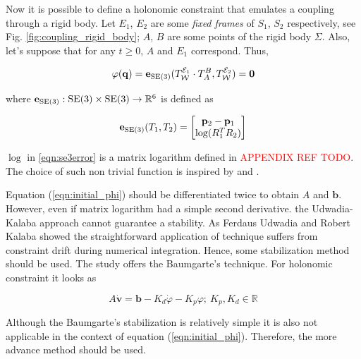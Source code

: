 Now it is possible to define a holonomic constraint that emulates a coupling 
through a rigid body. Let $E_1$, $E_2$ are some \emph{fixed frames} of 
$S_1$, $S_2$ respectively, see Fig. \ref{fig:coupling_rigid_body}; $A$, $B$ are 
some points of the rigid body $\Sigma$. Also, let's suppose that for any $t \geq 0$, 
$A$ and $E_1$ correspond. Thus, 

\begin{equation}
    \varphi(\mathbf{q}) = \mathbf{e}_{\text{SE}(3)}(
        T_{\mathcal{W}}^{\mathcal{E}_1} \cdot
        T_{A}^{B},
        T_{\mathcal{W}}^{\mathcal{E}_2}
    ) = \mathbf{0}
    \label{eqn:initial_phi}
\end{equation}

where $\mathbf{e}_{\text{SE}(3)}: \text{SE}(3) \times \text{SE}(3) \rightarrow \mathbb{R}^6$ is defined as

\begin{equation}
    \mathbf{e}_{\text{SE}(3)}(T_1, T_2) = 
    \begin{bmatrix}
        \mathbf{p}_2 - \mathbf{p}_1 \\
        \log (R_1^T R_2)
    \end{bmatrix}
    \label{eqn:se3error}
\end{equation}

$\log$ in \ref{eqn:se3error} is a matrix logarithm defined in 
\textcolor{red}{APPENDIX REF TODO}. The choice of such non trivial function is 
inspired by \cite{OutFeedbackStabForOrbRob} and \cite{ANonlinearObserverUsingPose}. 

Equation (\ref{eqn:initial_phi}) should be differentiated twice to obtain $A$ and 
$\mathbf{b}$. However, even if matrix logarithm had a simple second derivative. 
the Udwadia-Kalaba approach cannot guarantee a stability. As Ferdaus Udwadia and 
Robert Kalaba showed \cite{udwadia1996analytical} the straightforward application 
of technique suffers from constraint drift during numerical integration. Hence, 
some stabilization method should be used. The study \cite{udwadia1996analytical} 
offers the Baumgarte's technique. For holonomic constraint it looks as

\begin{equation}
    A \dot{\mathbf{v}} = \mathbf{b} - K_d \dot{\varphi} - K_p \varphi; \:
    K_p, K_d \in \mathbb{R}
    \label{eqn:baumgrate_stab}
\end{equation}

Although the Baumgarte's stabilization is relatively simple it is also not applicable 
in the context of equation (\ref{eqn:initial_phi}). Therefore, the more advance 
method should be used. 

